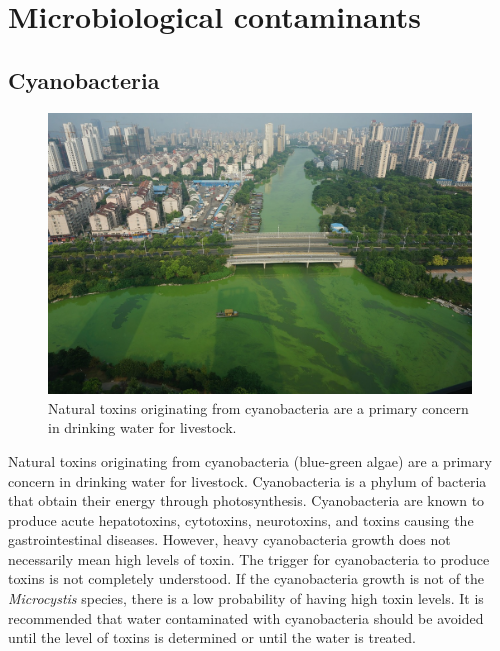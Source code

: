\documentclass[]{book}
\begin{document}
\hypertarget{microbiological-contaminants}{%
\section{Microbiological contaminants}\label{microbiological-contaminants}}

\hypertarget{cyanobacteria}{%
\subsection{Cyanobacteria}\label{cyanobacteria}}

\begin{figure}

{\centering \includegraphics[width=1\linewidth,height=1\textheight]{figures/cyanobacteria} 

}

\caption{Natural toxins originating from cyanobacteria are a primary concern in drinking water for livestock.}\label{fig:cyanobacteria}
\end{figure}

Natural toxins originating from cyanobacteria (blue-green algae) are a primary concern in drinking water for livestock. Cyanobacteria is a phylum of bacteria that obtain their energy through photosynthesis. Cyanobacteria are known to produce acute hepatotoxins, cytotoxins, neurotoxins, and toxins causing the gastrointestinal diseases. However, heavy cyanobacteria growth does not necessarily mean high levels of toxin. The trigger for cyanobacteria to produce toxins is not completely understood. If the cyanobacteria growth is not of the \emph{Microcystis} species, there is a low probability of having high toxin levels. It is recommended that water contaminated with cyanobacteria should be avoided until the level of toxins is determined or until the water is treated.
\end{document}
